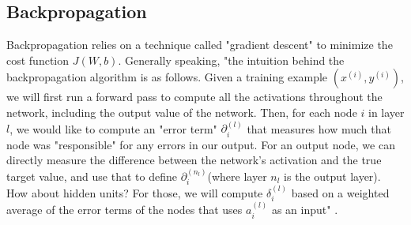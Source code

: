 \subsection{Backpropagation}

\setlength{\marginparwidth}{3cm}\leavevmode {}Backpropagation relies on a technique called "gradient descent" to minimize the cost function $J(W, b)$. Generally speaking, "the intuition behind the backpropagation algorithm is as follows. Given a training example $(x^{(i)}, y^{(i)})$, we will first run a forward pass to compute all the activations throughout the network, including the output value of the network. Then, for each node $i$ in layer $l$, we would like to compute an "error term" $\partial^{(l)}_{i}$ that measures how much that node was "responsible" for any errors in our output. For an output node, we can directly measure the difference between the network’s activation and the true target value, and use that to define $\partial^{(n_{l})}_{i}$(where layer $n_{l}$ is the output layer). How about hidden units? For those, we will compute $\delta^{(l)}_{i}$ based on a weighted average of the error terms of the nodes that uses $a^{(l)}_{i}$ as an input" \cite{24}.

